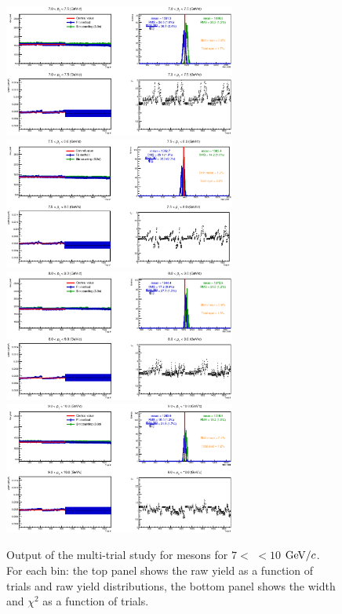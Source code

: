 \begin{figure}[!h]
\begin{center}
\includegraphics[width=0.68\textwidth]{figures/Dstar/pp13TeV/multi_trial/MultiFit_bkg5_7-7.eps}
\includegraphics[width=0.68\textwidth]{figures/Dstar/pp13TeV/multi_trial/MultiFit_bkg5_7-8.eps}
\includegraphics[width=0.68\textwidth]{figures/Dstar/pp13TeV/multi_trial/MultiFit_bkg5_8-9.eps}
\includegraphics[width=0.68\textwidth]{figures/Dstar/pp13TeV/multi_trial/MultiFit_bkg5_9-10.eps}
\caption{Output of the multi-trial study for \Dstar mesons for $7<$ \pt$<10$ ${\rm GeV}/c$. For each \pt bin: the top panel shows the raw yield as a function of trials and raw yield distributions, the bottom panel shows the width and $\chi^2$ as a function of trials.}
\label{fig:DstarYieldSyst010_4}
\end{center}
\end{figure}



